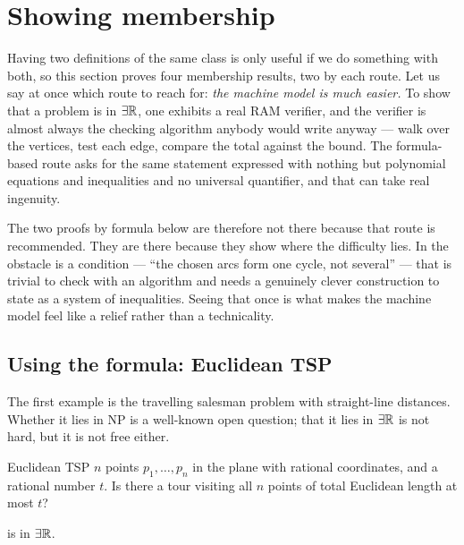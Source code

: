 \section{Showing membership}
\label{sec:er-membership}

Having two definitions of the same class is only useful if we do something with
both, so this section proves four membership results, two by each route. Let us
say at once which route to reach for: \emph{the machine model is much easier.}
To show that a problem is in $\exists\mathbb{R}$, one exhibits a real RAM verifier, and the
verifier is almost always the checking algorithm anybody would write anyway ---
walk over the vertices, test each edge, compare the total against the bound.
The formula-based route asks for the same statement expressed with nothing but
polynomial equations and inequalities and no universal quantifier, and that can
take real ingenuity.

The two proofs by formula below are therefore not there because that route is
recommended. They are there because they show where the difficulty lies. In
 the obstacle is a condition --- ``the chosen arcs form one
cycle, not several'' --- that is trivial to check with an algorithm and needs a
genuinely clever construction to state as a system of inequalities. Seeing that
once is what makes the machine model feel like a relief rather than a
technicality.

\subsection{Using the formula: Euclidean TSP}
\label{sec:er-membership-tsp}

The first example is the travelling salesman problem with straight-line
distances. Whether it lies in \textrm{NP} is a well-known open question;
that it lies in $\exists\mathbb{R}$ is not hard, but it is not free either.

\begin{probdef}{Euclidean TSP}
  \instance $n$ points $p_1, \ldots, p_n$ in the plane with rational
  coordinates, and a rational number $t$.
  \question Is there a tour visiting all $n$ points of total Euclidean length
  at most $t$?
\end{probdef}

\begin{proposition}\label{prop:er-tsp}
 is in $\exists\mathbb{R}$.
\end{proposition}

